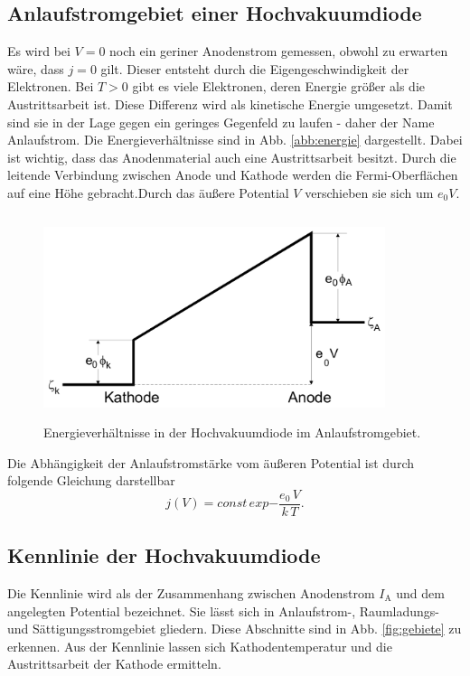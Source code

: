 \subsection{Anlaufstromgebiet einer Hochvakuumdiode}

Es wird bei $V = 0$ noch ein geriner Anodenstrom gemessen, 
obwohl zu erwarten wäre, dass $j = 0$ gilt. Dieser entsteht 
durch die Eigengeschwindigkeit der Elektronen. Bei $T > 0$ 
gibt es viele Elektronen, deren Energie größer als die 
Austrittsarbeit ist. Diese Differenz wird als kinetische 
Energie umgesetzt. Damit sind sie in der Lage gegen ein 
geringes Gegenfeld zu laufen - daher der Name Anlaufstrom. 
Die Energieverhältnisse sind in Abb. \ref{abb:energie}
dargestellt. Dabei ist wichtig, dass das Anodenmaterial auch 
eine Austrittsarbeit besitzt. Durch die leitende Verbindung 
zwischen Anode und Kathode werden die Fermi-Oberflächen auf 
eine Höhe gebracht.Durch das äußere Potential $V$ 
verschieben sie sich um $e_0 V$.

\begin{figure}
    \centering
    \includegraphics[width=10cm, height=6cm]{build/energie.png}
    \caption{Energieverhältnisse in der Hochvakuumdiode im Anlaufstromgebiet. \cite{V504}}
    \label{fig:energie}
\end{figure}

\noindent Die Abhängigkeit der Anlaufstromstärke vom äußeren
Potential ist durch folgende Gleichung darstellbar
\begin{equation}
    j(V) = const \, exp{-\frac{e_0 \, V}{k \, T}}.
    \label{eqn:anlauf}
\end{equation}

\subsection{Kennlinie der Hochvakuumdiode}

Die Kennlinie wird als der Zusammenhang zwischen Anodenstrom 
$I_\text{A}$ und dem angelegten Potential bezeichnet. 
Sie lässt sich in Anlaufstrom-, Raumladungs- und 
Sättigungsstromgebiet gliedern. 
Diese Abschnitte sind in Abb. \ref{fig:gebiete} zu erkennen.
Aus der Kennlinie lassen sich Kathodentemperatur und die 
Austrittsarbeit der Kathode ermitteln.

